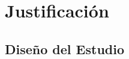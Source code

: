 %
%
%
%
%
%
%

\chapter{Justificación}
\label{cap:justificacion}

\section{Diseño del Estudio}
\label{sec:diseño_estudio}


